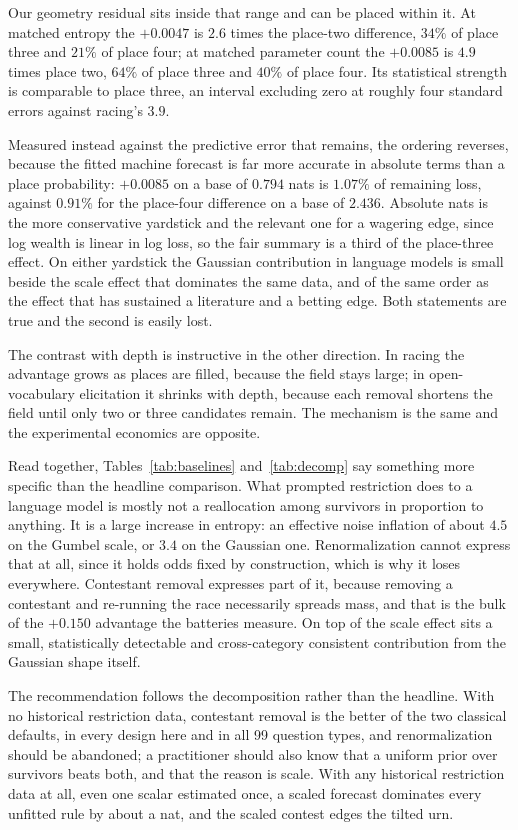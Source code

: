 \documentclass[11pt]{article}
\begin{document}
Our geometry residual sits inside that range and can be placed within it. At
matched entropy the $+0.0047$ is $2.6$ times the place-two difference, $34\%$
of place three and $21\%$ of place four; at matched parameter count the
$+0.0085$ is $4.9$ times place two, $64\%$ of place three and $40\%$ of place
four. Its statistical strength is comparable to place three, an interval
excluding zero at roughly four standard errors against racing's $3.9$.

Measured instead against the predictive error that remains, the ordering
reverses, because the fitted machine forecast is far more accurate in absolute
terms than a place probability: $+0.0085$ on a base of $0.794$ nats is $1.07\%$
of remaining loss, against $0.91\%$ for the place-four difference on a base of
$2.436$. Absolute nats is the more conservative yardstick and the relevant one
for a wagering edge, since log wealth is linear in log loss, so the fair summary
is a third of the place-three effect. On either yardstick the Gaussian
contribution in language models is small beside the scale effect that dominates
the same data, and of the same order as the effect that has sustained a
literature and a betting edge. Both statements are true and the second is
easily lost.

The contrast with depth is instructive in the other direction. In racing the
advantage grows as places are filled, because the field stays large; in
open-vocabulary elicitation it shrinks with depth, because each removal
shortens the field until only two or three candidates remain. The mechanism is
the same and the experimental economics are opposite.

Read together, Tables~\ref{tab:baselines} and~\ref{tab:decomp} say something
more specific than the headline comparison. What prompted restriction does to a
language model is mostly not a reallocation among survivors in proportion to
anything. It is a large increase in entropy: an effective noise inflation of
about $4.5$ on the Gumbel scale, or $3.4$ on the Gaussian one. Renormalization
cannot express that at all, since it holds odds fixed by construction, which is
why it loses everywhere. Contestant removal expresses part of it, because
removing a contestant and re-running the race necessarily spreads mass, and
that is the bulk of the $+0.150$ advantage the batteries measure. On top of the
scale effect sits a small, statistically detectable and cross-category
consistent contribution from the Gaussian shape itself.

The recommendation follows the decomposition rather than the headline. With no
historical restriction data, contestant removal is the better of the two
classical defaults, in every design here and in all 99 question types, and
renormalization should be abandoned; a practitioner should also know that a
uniform prior over survivors beats both, and that the reason is scale. With any
historical restriction data at all, even one scalar estimated once, a scaled
forecast dominates every unfitted rule by about a nat, and the scaled contest
edges the tilted urn.
\end{document}
